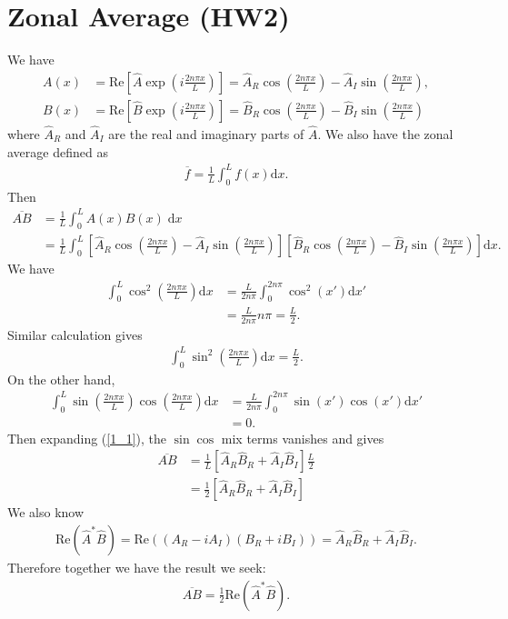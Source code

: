 \documentclass[11pt,letterpaper]{book}
\theoremstyle{definition}
\newcommand{\de}{\mathrm{d}}
\newcommand{\re}{\text{Re}}
\begin{document}
\section{Zonal Average (HW2)}\label{prob:HW2_q1}
We have 
\begin{align*}
A(x) &= \re\left[\hat{A}\exp\left(i\frac{2n\pi x}{L}\right)\right] = \hat{A}_R\cos\left(\frac{2n\pi x}{L}\right)-\hat{A}_I \sin\left(\frac{2n\pi x}{L}\right),\\
B(x) &= \re\left[\hat{B}\exp\left(i\frac{2n\pi x}{L}\right)\right] = \hat{B}_R\cos\left(\frac{2n\pi x}{L}\right)-\hat{B}_I \sin\left(\frac{2n\pi x}{L}\right)
\end{align*}
where $\hat{A}_R$ and $\hat{A}_I$ are the real and imaginary parts of $\hat{A}$. 
We also have the zonal average defined as
\begin{align*}
\overline{f} = \frac{1}{L}\int^L_0 f(x)\de x.
\end{align*}
Then
\begin{align}
\overline{AB} &= \frac{1}{L}\int^L_0 A(x)B(x)\;\de x \nonumber\\
&= \frac{1}{L}\int^L_0\left[\hat{A}_R\cos\left(\frac{2n\pi x}{L}\right)-\hat{A}_I \sin\left(\frac{2n\pi x}{L}\right)\right]
\left[\hat{B}_R\cos\left(\frac{2n\pi x}{L}\right)-\hat{B}_I \sin\left(\frac{2n\pi x}{L}\right)\right] \de x.\label{1_1}
\end{align}
We have
\begin{align*}
\int^L_0 \cos^2\left(\frac{2n\pi x}{L}\right) \de x &= \frac{L}{2n\pi}\int^{2n\pi}_0 \cos^2\left(x'\right) \de x'\\
&= \frac{L}{2n\pi}n\pi = \frac{L}{2}.
\end{align*}
Similar calculation gives
\begin{align*}
\int^L_0 \sin^2\left(\frac{2n\pi x}{L}\right) \de x = \frac{L}{2}.
\end{align*}
On the other hand, 
\begin{align*}
\int^L_0 \sin\left(\frac{2n\pi x}{L}\right)\cos\left(\frac{2n\pi x}{L}\right) \de x &= \frac{L}{2n\pi}\int^{2n\pi}_0 \sin\left(x'\right)\cos\left(x'\right) \de x'\\
&= 0.
\end{align*}
Then expanding (\ref{1_1}), the $\sin\cos$ mix terms vanishes and gives
\begin{align*}
\overline{AB} &= \frac{1}{L}\left[ \hat{A}_R\hat{B}_R+\hat{A}_I\hat{B}_I \right]\frac{L}{2}\\
&= \frac{1}{2}\left[ \hat{A}_R\hat{B}_R+\hat{A}_I\hat{B}_I \right]
\end{align*}
We also know
\begin{align*}
\re\left(\hat{A}^*\hat{B} \right) = \re\left( (A_R-iA_I)(B_R+iB_I) \right) = \hat{A}_R\hat{B}_R+\hat{A}_I\hat{B}_I.
\end{align*}
Therefore together we have the result we seek:
\begin{align*}
\overline{AB} = \frac{1}{2}\re\left(\hat{A}^*\hat{B} \right).
\end{align*}
\end{document}
